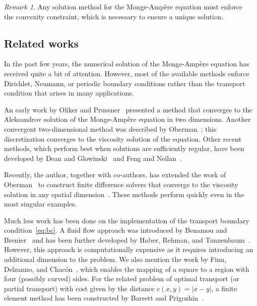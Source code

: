 \documentclass{amsart}
\theoremstyle{lemma}
\theoremstyle{remark}
\newtheorem{remark}{Remark}
\begin{document}
\begin{remark}
Any solution method for the {{Monge-Amp\`ere}\xspace} equation must enforce the convexity constraint, which is necessary to ensure a unique solution.  
\end{remark}

\subsection{Related works}\label{sec:related}
In the past few years, the numerical solution of the {{Monge-Amp\`ere}\xspace} equation has received quite a bit of attention.  However, most of the available methods enforce Dirichlet, Neumann, or periodic boundary conditions rather than the transport condition that arises in many applications.

An early work by Oliker and Prussner~\cite{olikerprussner88} presented a method that converges to the Aleksandrov solution of the {{Monge-Amp\`ere}\xspace} equation in two dimensions.  Another convergent two-dimensional method was described by Oberman~\cite{ObermanEigenvalues}; this discretization converges to the viscosity solution of the equation.  Other recent methods, which perform best when solutions are sufficiently regular, have been developed by Dean and Glowinski~\cite{DGaug,DGnum2008, GlowinksiICIAM} and Feng and Neilan~\cite{FengMA, FengFully}. 

Recently, the author, together with co-authors, has extended the work of Oberman~\cite{ObermanSINUM,ObermanEigenvalues} to construct finite difference solvers that converge to the viscosity solution in any spatial dimension~\cite{BeFrObMA,FOTheory,FONum}.  These methods perform quickly even in the most singular examples.

Much less work has been done on the implementation of the transport boundary condition~\eqref{eq:bc}.  A fluid flow approach was introduced by Benamou and Brenier~\cite{BenBren} and has been further developed by Haber, Rehman, and Tannenbaum~\cite{HaberTransport}.  However, this approach is computationally expensive as it requires introducing an additional dimension to the problem.  We also mention the work by Finn, Delzanno, and Chac{\'o}n~\cite{DelzannoGrid}, which enables the mapping of a square to a region with four (possibly curved) sides.  For the related problem of optimal transport (or partial transport) with cost given by the distance $c(x,y) = {\left\vert{x-y}\right\vert}$, a finite element method has been constructed by Barrett and Prigozhin~\cite{BarPrigL1Transport,BarPrigL1PartialTransport}.
\end{document}
